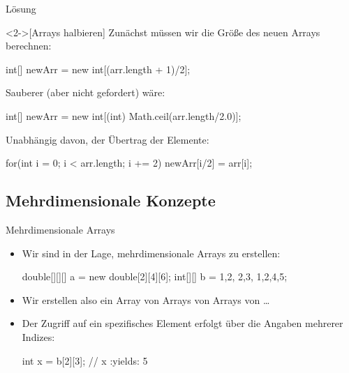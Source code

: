 \begin{frame}[c,fragile]{Lösung}
    \begin{solve}<2->[Arrays halbieren]
    Zunächst müssen wir die Größe des neuen Arrays berechnen:
\begin{plainjava}
int[] newArr = new int[(arr.length + 1)/2];
\end{plainjava}
    Sauberer (aber nicht gefordert) wäre:
\begin{plainjava}
int[] newArr = new int[(int) Math.ceil(arr.length/2.0)];
\end{plainjava}
    Unabhängig davon, der Übertrag der Elemente:
\begin{plainjava}
for(int i = 0; i < arr.length; i += 2) {
    newArr[i/2] = arr[i];
}
\end{plainjava}
    \end{solve}
\end{frame}

\fi


\subsection{Mehrdimensionale Konzepte}%

\begin{frame}[fragile]{Mehrdimensionale Arrays}
    \begin{itemize}[<+(1)->]
        \widei
        \item Wir sind in der Lage, mehrdimensionale Arrays zu erstellen:\pause{}
\begin{plainjava}
double[][][] a = new double[2][4][6];
int[][] b = {{1,2}, {2,3}, {1,2,4,5}};
\end{plainjava}
        \item Wir erstellen also ein Array von Arrays von Arrays von \ldots
        \item Der Zugriff auf ein spezifisches Element erfolgt über die Angaben mehrerer Indizes:
\begin{plainjava}
int x = b[2][3]; // x :yields: 5
\end{plainjava}
    \end{itemize}
\end{frame}

